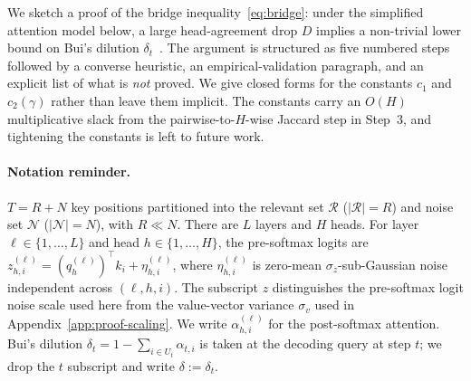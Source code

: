 We sketch a proof of the bridge inequality~\eqref{eq:bridge}: under the
simplified attention model below, a large head-agreement drop $D$
implies a non-trivial lower bound on Bui's dilution
$\delta_t$~\citep{arxiv260509649}. The argument is structured as five
numbered steps followed by a converse heuristic, an empirical-validation
paragraph, and an explicit list of what is \emph{not} proved. We give
closed forms for the constants $c_1$ and $c_2(\gamma)$ rather than
leave them implicit. The constants carry an $O(H)$ multiplicative slack
from the pairwise-to-$H$-wise Jaccard step in Step~3, and tightening the
constants is left to future work.

\paragraph{Notation reminder.}
$T = R + N$ key positions partitioned into the relevant set
$\mathcal{R}$ ($|\mathcal{R}| = R$) and noise set $\mathcal{N}$
($|\mathcal{N}| = N$), with $R \ll N$. There are $L$ layers and $H$
heads. For layer $\ell \in \{1, \dots, L\}$ and head $h \in \{1, \dots,
H\}$, the pre-softmax logits are $z^{(\ell)}_{h, i} = (q^{(\ell)}_h)^\top
k_i + \eta^{(\ell)}_{h, i}$, where $\eta^{(\ell)}_{h, i}$ is zero-mean
$\sigma_z$-sub-Gaussian noise independent across $(\ell, h, i)$. The
subscript $z$ distinguishes the pre-softmax logit noise scale used here
from the value-vector variance $\sigma_v$ used in
Appendix~\ref{app:proof-scaling}. We write $\alpha^{(\ell)}_{h, i}$ for
the post-softmax attention. Bui's dilution $\delta_t = 1 - \sum_{i \in
U_t} \alpha_{t, i}$ is taken at the decoding query at step $t$; we drop
the $t$ subscript and write $\delta := \delta_t$.

